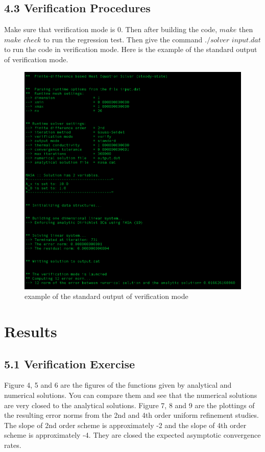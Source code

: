 \documentclass{article}
\begin{document}
\subsection*{4.3 Verification Procedures}
Make sure that verification mode is 0. Then after building the code, $make$ then $make$ $check$ to run the regression test. Then give the command $./solver$ $input.dat$ to run the code in verification mode. Here is the example of the standard output of verification mode.
\newpage
\begin{figure}[h!]
  \includegraphics[width=\linewidth]{figure_3}
  \caption{example of the standard output of verification mode}
\end{figure}

\section{Results}

\subsection*{5.1 Verification Exercise}
Figure 4, 5 and 6 are the figures of the functions given by analytical and numerical solutions. You can compare them and see that the numerical solutions are very closed to the analytical solutions. Figure 7, 8 and 9 are the plottings of the resulting error norms from the 2nd and 4th order uniform refinement studies. The slope of 2nd order scheme is approximately -2 and the slope of 4th order scheme is approximately -4. They are closed the expected asymptotic convergence rates.
\end{document}
